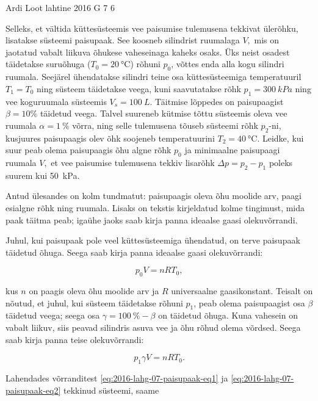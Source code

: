 {Ardi Loot} %
{lahtine} %
{2016} %
{G 7} %
{6} %
{
\ifStatement
Selleks, et vältida küttesüsteemis vee paisumise tulemusena tekkivat
ülerõhku, lisatakse süsteemi paisupaak. See koosneb silindrist ruumalaga
$V,$ mis on jaotatud vabalt liikuva õhukese vaheseinaga kaheks osaks. Üks
neist osadest täidetakse suruõhuga ($T_{0}=\SI{20}{\celsius}$)
rõhuni $p_{0}$, võttes enda alla kogu silindri ruumala. Seejärel ühendatakse silindri teine osa küttesüsteemiga temperatuuril $T_{1}=T_{0}$ ning süsteem täidetakse
veega, kuni saavutatakse rõhk $p_{1}=\SI{300}{kPa}$ ning vee koguruumala süsteemis $V_{s}=\SI{100}{L}$.
Täitmise lõppedes on paisupaagist $\beta=10\%$ täidetud veega. Talvel suureneb kütmise tõttu süsteemis oleva vee ruumala $\alpha=\SI{1}{\%}$ võrra, ning selle tulemusena tõuseb süsteemi rõhk $p_{2}$-ni, kusjuures paisupaagis olev õhk soojeneb temperatuurini $T_{2}=\SI{40}{\celsius}$. Leidke, kui suur peab olema paisupaagis
õhu algne rõhk $p_{0}$ ja minimaalne paisupaagi ruumala $V,$
et vee paisumise tulemusena tekkiv lisarõhk $\Delta p=p_{2}-p_{1}$
poleks suurem kui \SI{50}{kPa}. 
\fi


\ifHint
Antud ülesandes on kolm tundmatut: paisupaagis oleva õhu moolide arv, paagi esialgne rõhk ning ruumala. Lisaks on tekstis kirjeldatud kolme tingimust, mida paak täitma peab; igaühe jaoks saab kirja panna ideaalse gaasi olekuvõrrandi.
\fi


\ifSolution
Juhul, kui paisupaak pole veel küttesüsteemiga ühendatud, on terve
paisupaak täidetud õhuga. Seega saab kirja panna ideaalse gaasi olekuvõrrandi:

\begin{equation}
p_{0}V=nRT_{0},\label{eq:2016-lahg-07-paisupaak-eq1}
\end{equation}

\noindent kus $n$ on paagis oleva õhu moolide arv ja $R$ universaalne
gaasikonstant. Teisalt on nõutud, et juhul, kui süsteem täidetakse
rõhuni $p_{1}$, peab olema paisupaagist osa $\beta$ täidetud veega;
seega osa $\gamma=\SI{100}{\%}-\beta$ on täidetud õhuga. Kuna vahesein
on vabalt liikuv, siis peavad silindris asuva vee ja õhu rõhud olema
võrdsed. Seega saab kirja panna teise olekuvõrrandi:

\begin{equation}
p_{1}\gamma V=nRT_{0}.\label{eq:2016-lahg-07-paisupaak-eq2}
\end{equation}


\noindent Lahendades võrranditest \eqref{eq:2016-lahg-07-paisupaak-eq1} ja \eqref{eq:2016-lahg-07-paisupaak-eq2} tekkinud süsteemi, saame

}
